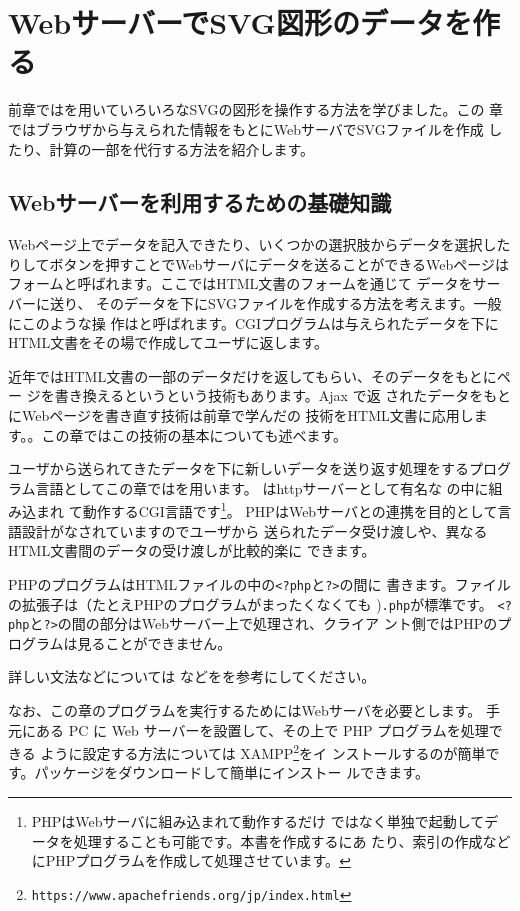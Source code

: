 \chapter{WebサーバーでSVG図形のデータを作る}\label{svgwithserver}
前章では\JS を用いていろいろなSVGの図形を操作する方法を学びました。この
章ではブラウザから与えられた情報をもとにWebサーバでSVGファイルを作成
したり、計算の一部を代行する方法を紹介します。
\section{Webサーバーを利用するための基礎知識}
Webページ上でデータを記入できたり、いくつかの選択肢からデータを選択した
りしてボタンを押すことでWebサーバにデータを送ることができるWebページは
フォームと呼ばれます。ここではHTML文書のフォームを通じて
データをサーバーに送り、
そのデータを下にSVGファイルを作成する方法を考えます。一般にこのような操
作はと呼ばれます。CGIプログラムは与えられたデータを下に
HTML文書をその場で作成してユーザに返します。

近年ではHTML文書の一部のデータだけを返してもらい、そのデータをもとにペー
ジを書き換えるというという技術もあります。Ajax で返
されたデータをもとにWebページを書き直す技術は前章で学んだの
技術をHTML文書に応用します。。この章ではこの技術の基本についても述べます。

ユーザから送られてきたデータを下に新しいデータを送り返す処理をするプログ
ラム言語としてこの章ではを用います。
はhttpサーバーとして有名な
の中に組み込まれ
て動作するCGI言語です\footnote{PHPはWebサーバに組み込まれて動作するだけ
ではなく単独で起動してデータを処理することも可能です。本書を作成するにあ
たり、索引の作成などにPHPプログラムを作成して処理させています。}。
PHPはWebサーバとの連携を目的として言語設計がなされていますのでユーザから
送られたデータ受け渡しや、異なるHTML文書間のデータの受け渡しが比較的楽に
できます。

PHPのプログラムはHTMLファイルの中の\texttt{<?php}と\texttt{?>}の間に
書きます。ファイルの拡張子は（たとえPHPのプログラムがまったくなくても
)\texttt{.php}が標準です。
\texttt{<?php}と\texttt{?>}の間の部分はWebサーバー上で処理され、クライア
ント側ではPHPのプログラムは見ることができません。

詳しい文法などについては%
\cite{learningphp}などをを参考にしてください。

なお、この章のプログラムを実行するためにはWebサーバを必要とします。
手元にある PC に Web サーバーを設置して、その上で PHP プログラムを処理できる
ように設定する方法については
XAMPP\footnote{\texttt{https://www.apachefriends.org/jp/index.html}}をイ
ンストールするのが簡単です。パッケージをダウンロードして簡単にインストー
ルできます。
\iffalse\else

%



%
%
\fi